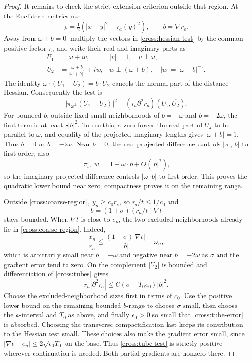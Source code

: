 \begin{proof}
It remains to check the strict extension criterion outside that region.
At the Euclidean metrics use
\[
 \rho=\tfrac12(|x-y|^2-r_a(y)^2),\qquad b=\nabla r_a.
\]
Away from $\omega+b=0$, multiply the vectors in
\eqref{cross:hessian-test} by the common positive factor $r_a$ and
write their real and imaginary parts as
\begin{equation}\label{cross:null-vectors}
 \begin{aligned}
 U_1&=\omega+iv,& |v|=1,\quad v\perp\omega,\\
 U_2&=\frac{\omega+b}{|\omega+b|^2}+iw,
 &w\perp(\omega+b),\quad |w|=|\omega+b|^{-1}.
 \end{aligned}
\end{equation}
The identity $\omega\cdot(U_1-U_2)=b\cdot U_2$ cancels the normal
part of the distance Hessian.  Consequently the test is
\begin{equation}\label{cross:tube-test}
 \big|\pi_{\omega^\perp}(U_1-U_2)\big|^2
 -(r_a\partial^2r_a)(U_2,\overline{U_2}).
\end{equation}
For bounded $b$, outside fixed small neighborhoods of
$b=-\omega$ and $b=-2\omega$, the first term is at least $c|b|^2$.
To see this, a zero forces the real part of $U_2$ to be parallel to
$\omega$, and equality of the projected imaginary lengths gives
$|\omega+b|=1$.  Thus $b=0$ or $b=-2\omega$.
Near $b=0$, the real projected difference controls
$|\pi_{\omega^\perp}b|$ to first order; also
\[
 |\pi_{\omega^\perp}w|
 =1-\omega\cdot b+O(|b|^2),
\]
so the imaginary projected difference controls $|\omega\cdot b|$
to first order.  This proves the quadratic lower bound near zero;
compactness proves it on the remaining range.

Outside \eqref{cross:coarse-region}, $y_n\ge c_0r_a$, so
$r_a/t\le1/c_0$ and
\[
 b=(1+\sigma)(r_a/t)\nabla t
\]
stays bounded.  When $\nabla t$ is close to $e_n$, the two excluded
neighborhoods already lie in \eqref{cross:coarse-region}.  Indeed,
\[
 \frac{x_n}{r_a}
 \le \frac{(1+\sigma)|\nabla t|}{|b|}+\omega_n,
\]
which is arbitrarily small near $b=-\omega$ and negative near
$b=-2\omega$ as $\sigma$ and the gradient error tend to zero.
On the complement $|U_2|$ is bounded and differentiation of
\eqref{cross:tubes} gives
\begin{equation}\label{cross:tube-error}
 r_a|\partial^2r_a|
 \le C(\sigma+T_0e_0)|b|^2.
\end{equation}
Choose the excluded-neighborhood sizes first in terms of $c_0$.
Use the positive lower bound on the remaining bounded $b$-range to
choose $\sigma$ small, then choose the $a$-interval and $T_0$ as above,
and finally $e_0>0$ so small that \eqref{cross:tube-error} is absorbed.
Choosing the transverse compactification last keeps its contribution
to the Hessian test small. These choices also make the gradient error small, since
$|\nabla t-e_n|\le2\sqrt{e_0T_0}$ on the base.
Thus \eqref{cross:tube-test} is strictly positive wherever continuation
is needed.  Both partial gradients are nonzero there.


\end{proof}
